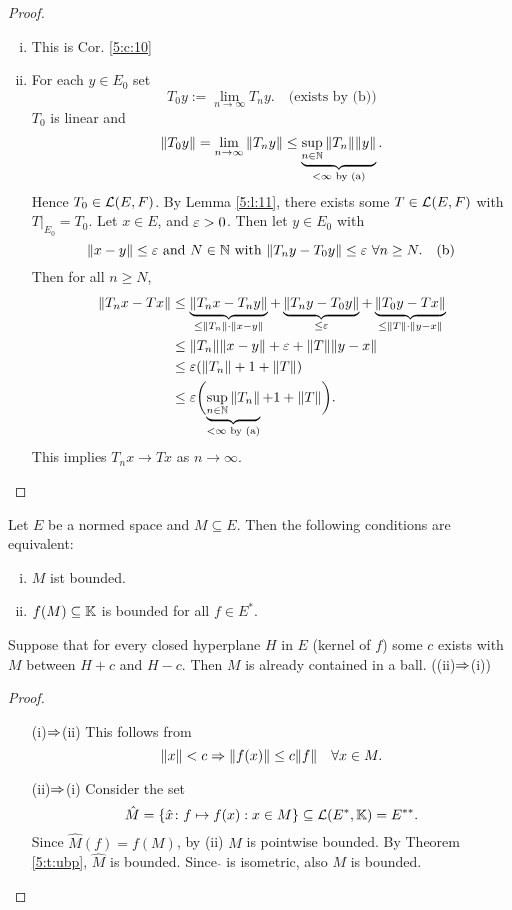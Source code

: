 \begin{proof}\hfill

\begin{enumerate}[(i)]\item This is Cor. \ref{5:c:10}
\item For each $y\in E_0$ set \[T_0y:=\lim_{n\to\infty}T_ny.\quad\text{(exists by (b))}\]
$T_0$ is linear and \[\|T_0y\|=\lim_{n\to\infty}\|T_ny\|\leq\underbrace{\sup_{n\in\mathbb{N}}\|T_n\|\|y\|}_{<\infty\text{ by (a)}}.\]
Hence $T_0\in\mathcal L(E,F)$. By Lemma \ref{5:l:11}, there exists some $T\in\mathcal L(E,F)$ with $T\vert_{E_0}=T_0$.
Let $x\in E$, and $\varepsilon>0$. Then let $y\in E_0$ with \[\|x-y\|\leq\varepsilon\text{ and }N\in\mathbb{N}\text{ with }\|T_ny-T_0y\|\leq\varepsilon\ \forall n\geq N.\quad\text{(b)}\]
Then for all $n\geq N$, \begin{align*}\|T_nx-Tx\|&\leq\underbrace{\|T_nx-T_ny\|}_{\leq\|T_n\|\cdot\|x-y\|}+\underbrace{\|T_ny-T_0y\|}_{\leq\varepsilon}+\underbrace{\|T_0y-Tx\|}_{\leq\|T\|\cdot\|y-x\|}\\&\leq\|T_n\|\|x-y\|+\varepsilon+\|T\|\|y-x\|\\&\leq\varepsilon(\|T_n\|+1+\|T\|)\\&\leq\varepsilon\biggl(\underbrace{\sup_{n\in\mathbb{N}}\|T_n\|}_{<\infty\text{ by (a)}}+1+\|T\|\biggr).\end{align*}
This implies $T_nx\to Tx$ as $n\to\infty$.
\end{enumerate}
\end{proof}
\begin{theo}\label{5:t:13}
Let $E$ be a normed space and $M\subseteq E$.
Then the following conditions are equivalent:
\begin{enumerate}[(i)]\item $M$ ist bounded.
\item $f(M)\subseteq\mathbb{K}$ is bounded for all $f\in E^*$.
\end{enumerate}
\end{theo}
\begin{bem}
Suppose that for every closed hyperplane $H$ in $E$ (kernel of $f$) some $c$ exists with $M$ between $H+c$ and $H-c$.
Then $M$ is already contained in a ball. \hfill ((ii)$\Rightarrow$(i))
\end{bem}
\begin{proof}\hfill

\begin{itemize}\item[(i)$\Rightarrow$(ii)] This follows from \[\|x\|<c\Rightarrow\|f(x)\|\leq c\|f\|\quad\forall x\in M.\]
\item[(ii)$\Rightarrow$(i)] Consider the set \[\hat M=\{\hat x\colon f\mapsto f(x):x\in M\}\subseteq\mathcal L(E^*,\mathbb{K})=E^{**}.\]
Since $\hat M(f)=f(M)$, by (ii) $M$ is pointwise bounded. By Theorem \ref{5:t:ubp}, $\hat M$ is bounded. Since $\hat{}$ is isometric, also $M$ is bounded.
\end{itemize}
\end{proof}
